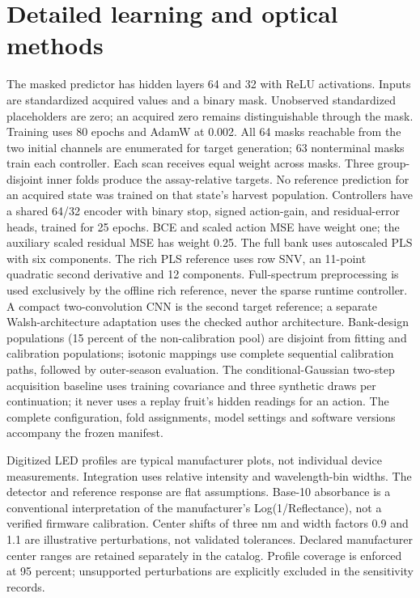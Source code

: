 \documentclass[10pt,a4paper]{article}
\begin{document}
\section{Detailed learning and optical methods}
The masked predictor has hidden layers 64 and 32 with ReLU activations. Inputs are standardized acquired values and a binary mask.
Unobserved standardized placeholders are zero; an acquired zero remains distinguishable through the mask.
Training uses 80 epochs and AdamW at 0.002. All 64 masks reachable from the two initial channels are enumerated for target generation;
63 nonterminal masks train each controller. Each scan receives equal weight across masks.
Three group-disjoint inner folds produce the assay-relative targets. No reference prediction for an acquired state was trained on that state's harvest population.
Controllers have a shared 64/32 encoder with binary stop, signed action-gain, and residual-error heads, trained for 25 epochs.
BCE and scaled action MSE have weight one; the auxiliary scaled residual MSE has weight 0.25.
The full bank uses autoscaled PLS with six components. The rich PLS reference uses row SNV, an 11-point quadratic second derivative and 12 components.
Full-spectrum preprocessing is used exclusively by the offline rich reference, never the sparse runtime controller.
A compact two-convolution CNN is the second target reference; a separate Walsh-architecture adaptation uses the checked author architecture.
Bank-design populations (15 percent of the non-calibration pool) are disjoint from fitting and calibration populations; isotonic mappings use complete sequential calibration paths, followed by outer-season evaluation.
The conditional-Gaussian two-step acquisition baseline uses training covariance and three synthetic draws per continuation; it never uses a replay fruit's hidden readings for an action.
The complete configuration, fold assignments, model settings and software versions accompany the frozen manifest.

Digitized LED profiles are typical manufacturer plots, not individual device measurements. Integration uses relative intensity and wavelength-bin widths.
The detector and reference response are flat assumptions. Base-10 absorbance is a conventional interpretation of the manufacturer's Log(1/Reflectance), not a verified firmware calibration.
Center shifts of three nm and width factors 0.9 and 1.1 are illustrative perturbations, not validated tolerances. Declared manufacturer center ranges are retained separately in the catalog.
Profile coverage is enforced at 95 percent; unsupported perturbations are explicitly excluded in the sensitivity records.
\end{document}
